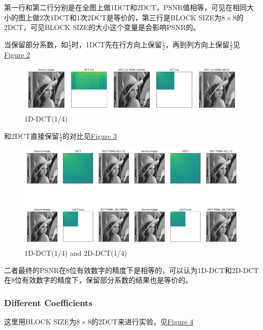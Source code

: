 \documentclass[UTF8]{ctexart}
\begin{document}
	第一行和第二行分别是在全图上做1DCT和2DCT，PSNR值相等，可见在相同大小的图上做2次1DCT和1次2DCT是等价的，第三行是BLOCK SIZE为$8\times 8$的2DCT，可见BLOCK SIZE的大小这个变量是会影响PSNR的。
	
	当保留部分系数，如$\frac{1}{4}$时，1DCT先在行方向上保留$\frac{1}{2}$，再到列方向上保留$\frac{1}{2}$见\hyperref[Fig.part1-1-2]{Figure 2}
	\begin{figure}[htbp]
		\centering
		\includegraphics[width=1.0\textwidth]{../part1-1-2.png}
		\caption{1D-DCT(1/4)}
		\label{Fig.part1-1-2}
	\end{figure}

	和2DCT直接保留$\frac{1}{4}$的对比见\hyperref[Fig.part1-1-3]{Figure 3}
	\begin{figure}[htbp]
		\centering
		\includegraphics[width=1.0\textwidth]{../part1-1-3.png}
		\caption{1D-DCT(1/4) and 2D-DCT(1/4)}
		\label{Fig.part1-1-3}
	\end{figure}
	
	二者最终的PSNR在8位有效数字的精度下是相等的，可以认为1D-DCT和2D-DCT在8位有效数字的精度下，保留部分系数的结果也是等价的。
	
	\subsubsection{Different Coefficients}
	
	这里用BLOCK SIZE为$8\times 8$的2DCT来进行实验，见\hyperref[Fig.part1-2]{Figure 4}
	
\end{document}
